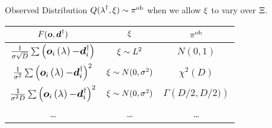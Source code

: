 \begin{block}{Observed Distribution}
\centering
\Large
    $Q(\operatorname*{\lambda}^\dagger, \operatorname*{\xi}) \sim \operatorname*{\pi^{ob}}$ when we allow $\operatorname*{\xi}$ to vary over $\operatorname*{\Xi}$.
\vspace{1cm}
    \begin{table}
      \centering
      \begin{tabular}{c c c}
        \textbf{$F(\boldsymbol{o}, \boldsymbol{d}^\dagger)$} & \textbf{$\operatorname*{\xi}$} & {$\operatorname*{\pi^{ob}}$} \\
        \midrule
        $\frac{1}{\sigma\sqrt{D}} \large\sum \left( \boldsymbol{o}_i\operatorname*{\left ( \operatorname*{\lambda} \right )} - \boldsymbol{d}_i^\dagger \right)$ & $\operatorname*{\xi} \sim L^2$ & $N(0,1)$ \\
        $\frac{1}{\sigma^2} \large\sum \left ( \boldsymbol{o}_i\operatorname*{\left ( \operatorname*{\lambda} \right )} - \boldsymbol{d}_i^\dagger \right)^2$ & $\operatorname*{\xi} \sim N(0,\sigma^2)$ & $\chi^2 (D)$ \\
        $\frac{1}{\sigma^2 D} \large\sum \left ( \boldsymbol{o}_i\operatorname*{\left ( \operatorname*{\lambda} \right )} - \boldsymbol{d}_i^\dagger \right)^2$ & $\operatorname*{\xi} \sim N(0,\sigma^2)$ & $\Gamma \left ( D/2, D/2) \right )$ \\
        \dots & \dots & \dots \\
        \bottomrule
      \end{tabular}
    \end{table}

%
\end{block}
